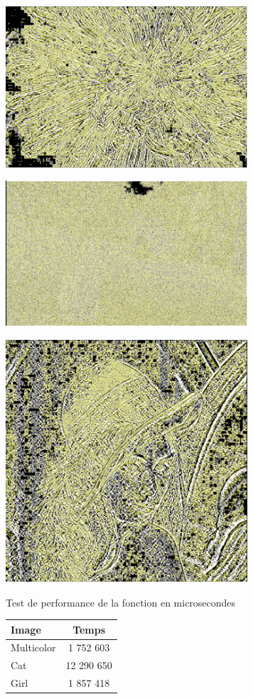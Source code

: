 \documentclass{article}
\begin{document}
\begin{center} 
    \includegraphics[width=9cm]{../Image_fonctions/Multicolor/Prewitt.PNG}
\end{center}
\begin{center} 
    \includegraphics[width=9cm]{../Image_fonctions/Cat/Prewitt.PNG}
\end{center}
\begin{center} 
    \includegraphics[width=9cm]{../Image_fonctions/Lenna/Prewitt.PNG}
\end{center}

\begin{center}
\medbreak
Test de performance de la fonction en microsecondes
\bigbreak
   \begin{tabular}{ | l | c | }
     \hline
     Image & Temps \\
     \hline
     Multicolor & 1 752 603 \\
     \hline
     Cat & 12 290 650 \\
     \hline
     Girl & 1 857 418 \\
     \hline
   \end{tabular}
 \end{center}
\bigbreak
\end{document}
